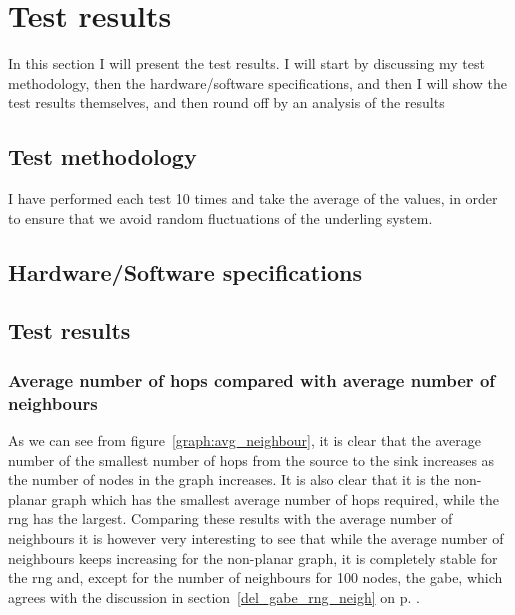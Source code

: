\section{Test results}
\label{section:test_results}
In this section I will present the test results. I will start by discussing my test methodology, then the hardware/software specifications, and then I will show the test results themselves, and then round off by an analysis of the results 

\subsection{Test methodology}
I have performed each test 10 times and take the average of the values, in order to ensure that we avoid random fluctuations of the underling system.

\subsection{Hardware/Software specifications}

\subsection{Test results}

\subsubsection{Average number of hops compared with average number of neighbours}

As we can see from figure~\ref{graph:avg_neighbour}, it is clear that the average number of the smallest number of hops from the source to the sink increases as the number of nodes in the graph increases. It is also clear that it is the non-planar graph which has the smallest average number of hops required, while the \ac{rng} has the largest. Comparing these results with the average number of neighbours it is however very interesting to see that while the average number of neighbours keeps increasing for the non-planar graph, it is completely stable for the \ac{rng} and, except for the number of neighbours for 100 nodes, the \ac{gabe}, which agrees with the discussion in section~\ref{del_gabe_rng_neigh} on p. \pageref{del_gabe_rng_neigh}. 

